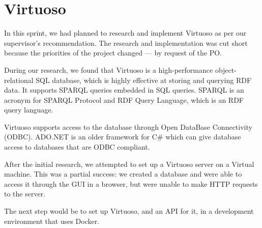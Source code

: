 \section{Virtuoso}
In this sprint, we had planned to research and implement Virtuoso as per our supervisor's recommendation.
The research and implementation was cut short because the priorities of the \knox{} project changed --- by request of the PO.

During our research, we found that Virtuoso is a high-performance object-relational SQL database, which is highly effective at storing and querying RDF data. It supports SPARQL queries embedded in SQL queries. SPARQL is an acronym for SPARQL Protocol and RDF Query Language, which is an RDF query language.


Virtuoso supports access to the database through Open DataBase Connectivity (ODBC).
ADO.NET is an older framework for C\# which can give database access to databases that are ODBC compliant.


After the initial research, we attempted to set up a Virtuoso server on a Virtual machine. This was a partial success: we created a database and were able to access it through the GUI in a browser, but were unable to make HTTP requests to the server.

The next step would be to set up Virtuoso, and an API for it, in a development environment that uses Docker.